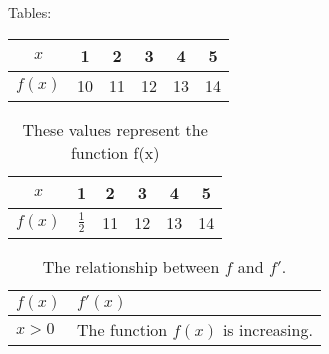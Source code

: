 \documentclass[11pt]{article}
\begin{document}
Tables:\\

\begin{tabular}{|c||c|c|c|c|c|}
    \hline
    $x$    & 1  & 2  & 3  & 4  & 5  \\ \hline
    $f(x)$ & 10 & 11 & 12 & 13 & 14 \\ \hline
\end{tabular}

\vspace{1cm}

\begin{table}[H]
    \centering
    \def\arraystretch{1.5}
    \begin{tabular}{|c||c|c|c|c|c|}
        \hline
        $x$    & 1             & 2  & 3  & 4  & 5  \\ \hline
        $f(x)$ & $\frac{1}{2}$ & 11 & 12 & 13 & 14 \\ \hline
    \end{tabular}
    \caption{These values represent the function f(x)}
\end{table}

\begin{table}[H]
    \centering
    \def\arraystretch{1.5}
    \begin{tabular}{|l|p{2in}|}
        \hline
        $f(x)$ & $f'(x)$                            \\ \hline
        $x>0 $ & The function $f(x)$ is increasing. \\ \hline
    \end{tabular}
    \caption{The relationship between $f$ and $f'$.}
\end{table}
\end{document}
